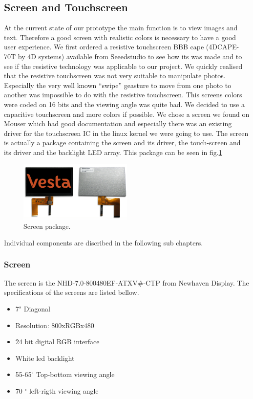 \subsection{Screen and Touchscreen}
At the current state of our prototype the main function is to view images and text. Therefore a good screen with realistic colors is necessary to have a good user experience.
We first ordered a resistive touchscreen BBB cape (4DCAPE-70T by 4D systems) available from Seeedstudio to see how its was made and to see if the resistive technology was applicable to our project. We quickly realised that the resistive touchscreen was not very suitable to manipulate photos. Especially the very well known “swipe” geasture to move from one photo to another was impossible to do with the resistive touchscreen.
This screens colors were coded on 16 bits and the viewing angle was quite bad. We decided to use a capacitive touchscreen and more colors if possible. We chose a screen we found on Mouser which had good documentation and especially there was an existing driver for the touchscreen IC in the linux kernel we were going to use.
 The screen is actually a package containing the screen and its driver, the touch-screen and its driver and the backlight LED array. This package can be seen in fig.\ref{fig:screen package}

 \begin{figure}[!htb]
     \centering
     \includegraphics[width=0.5\textwidth,keepaspectratio]{chap/hardFig/newhaven_screen_image}
     \caption{Screen package.}
     \label{fig:screen package}
 \end{figure}

 Individual components are discribed in the following sub chapters.

\subsubsection{Screen}
The screen is the NHD-7.0-800480EF-ATXV\#-CTP from Newhaven Display. The specifications of the screens are listed bellow.
\begin{itemize}
  \item {7" Diagonal}
  \item{Resolution: 800xRGBx480}
  \item{24 bit digital RGB interface}
  \item{White led backlight}
  \item{55-65$^{\circ}$ Top-bottom viewing angle }
  \item{70 $^{\circ}$ left-rigth viewing angle}
\end{itemize}


